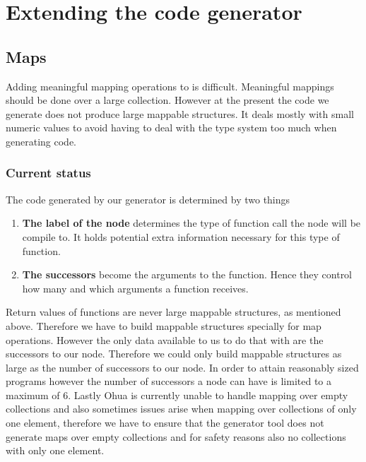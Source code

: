 \chapter{Extending the code generator}

\label{ch:extending-code-generator}

\section{Maps}

Adding meaningful mapping operations to is difficult.
Meaningful mappings should be done over a large collection.
However at the present the code we generate does not produce large mappable structures.
It deals mostly with small numeric values to avoid having to deal with the type system too much when generating code.

\subsection{Current status}

The code generated by our generator is determined by two things

\begin{enumerate}
    \item \textbf{The label of the node} determines the type of function call the node will be compile to.
          It holds potential extra information necessary for this type of function.
    \item \textbf{The successors} become the arguments to the function. Hence they control how many and which arguments a function receives.
\end{enumerate}

Return values of functions are never large mappable structures, as mentioned above.
Therefore we have to build mappable structures specially for map operations.
However the only data available to us to do that with are the successors to our node.
Therefore we could only build mappable structures as large as the number of successors to our node.
In order to attain reasonably sized programs however the number of successors a node can have is limited to a maximum of 6.
Lastly Ohua is currently unable to handle mapping over empty collections and also sometimes issues arise when mapping over collections of only one element, therefore we have to ensure that the generator tool does not generate maps over empty collections and for safety reasons also no collections with only one element.

